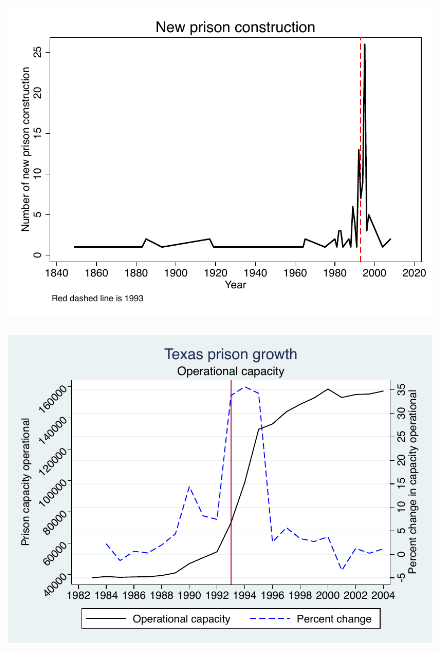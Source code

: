 \documentclass{beamer}
\begin{document}
\begin{frame}[shrink=30,plain]

\begin{figure}
\includegraphics{./lecture_includes/tdcj.pdf}
\end{figure}
\end{frame}


\begin{frame}[shrink=30,plain]
\begin{figure}
\includegraphics{./lecture_includes/capacity_operational_texas.pdf}
\end{figure}
\end{frame}
\end{document}
